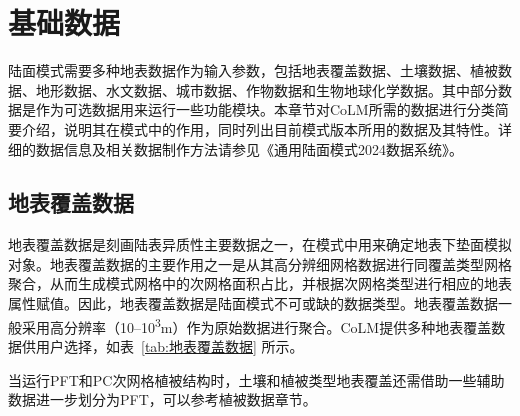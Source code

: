 \chapter{基础数据}\label{基础数据}

陆面模式需要多种地表数据作为输入参数，包括地表覆盖数据、土壤数据、植被数据、地形数据、水文数据、城市数据、作物数据和生物地球化学数据。其中部分数据是作为可选数据用来运行一些功能模块。本章节对CoLM所需的数据进行分类简要介绍，说明其在模式中的作用，同时列出目前模式版本所用的数据及其特性。详细的数据信息及相关数据制作方法请参见《通用陆面模式2024数据系统》。

\section{地表覆盖数据}\label{地表覆盖数据}

地表覆盖数据是刻画陆表异质性主要数据之一，在模式中用来确定地表下垫面模拟对象。地表覆盖数据的主要作用之一是从其高分辨细网格数据进行同覆盖类型网格聚合，从而生成模式网格中的次网格面积占比，并根据次网格类型进行相应的地表属性赋值。因此，地表覆盖数据是陆面模式不可或缺的数据类型。地表覆盖数据一般采用高分辨率（10--10\textsuperscript{3}m）作为原始数据进行聚合。CoLM提供多种地表覆盖数据供用户选择，如表~\ref{tab:地表覆盖数据} 所示。

当运行PFT和PC次网格植被结构时，土壤和植被类型地表覆盖还需借助一些辅助数据进一步划分为PFT，可以参考植被数据章节。

